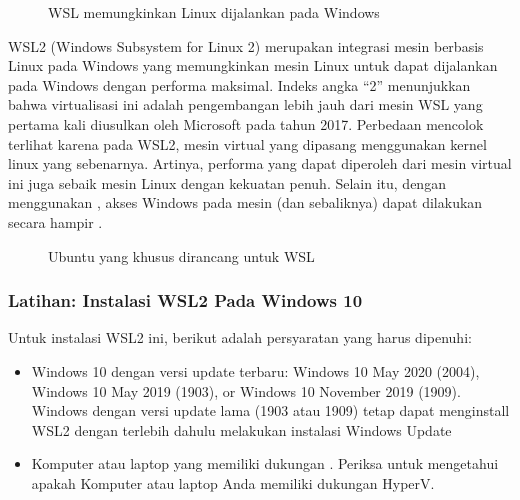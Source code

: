 \documentclass[letterpaper,10pt,english]{sphinxmanual}
\begin{document}
\begin{figure}[htbp]
\centering
\capstart

\noindent{}
\caption{WSL memungkinkan Linux dijalankan pada Windows}\label{\detokenize{sesi1/pengantarlinux:wsl}}\end{figure}

WSL2 (Windows Subsystem for Linux 2) merupakan integrasi mesin berbasis Linux pada Windows yang memungkinkan mesin Linux untuk dapat dijalankan pada Windows dengan performa maksimal. Indeks angka “2” menunjukkan bahwa virtualisasi ini adalah pengembangan lebih jauh dari mesin WSL yang pertama kali diusulkan oleh Microsoft pada tahun 2017. Perbedaan mencolok terlihat karena pada WSL2, mesin virtual yang dipasang menggunakan kernel linux yang sebenarnya. Artinya, performa yang dapat diperoleh dari mesin virtual ini juga sebaik mesin Linux dengan kekuatan penuh. Selain itu, dengan menggunakan , akses Windows pada mesin (dan sebaliknya) dapat dilakukan secara hampir .

\begin{figure}[htbp]
\centering
\capstart

\noindent{}
\caption{Ubuntu yang khusus dirancang untuk WSL}\label{\detokenize{sesi1/pengantarlinux:wsl2}}\end{figure}


\subsubsection{Latihan: Instalasi WSL2 Pada Windows 10}
\label{\detokenize{sesi1/pengantarlinux:latihan-instalasi-wsl2-pada-windows-10}}
Untuk instalasi WSL2 ini, berikut adalah persyaratan yang harus dipenuhi:
\begin{itemize}
\item {} 
Windows 10 dengan versi update terbaru: Windows 10 May 2020 (2004), Windows 10 May 2019 (1903), or Windows 10 November 2019 (1909). Windows dengan versi update lama (1903 atau 1909) tetap dapat menginstall WSL2 dengan terlebih dahulu melakukan instalasi Windows Update 

\item {} 
Komputer atau laptop yang memiliki dukungan . Periksa  untuk mengetahui apakah Komputer atau laptop Anda memiliki dukungan Hyper\sphinxhyphen{}V.

\end{itemize}
\end{document}
